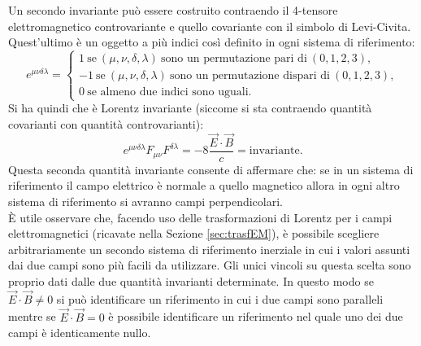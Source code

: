 Un secondo invariante può essere costruito contraendo il 4-tensore elettromagnetico controvariante e quello covariante con il simbolo di Levi-Civita. Quest'ultimo è un oggetto a più indici così definito in ogni sistema di riferimento:
\begin{equation}
    e^{\mu\nu\delta\lambda}=\begin{cases}
        1\ \text{se}\ (\mu,\nu,\delta,\lambda)\ \text{sono un permutazione pari di}\ (0,1,2,3),\\
        -1\ \text{se}\ (\mu,\nu,\delta,\lambda)\ \text{sono un permutazione dispari di}\ (0,1,2,3),\\
        0\ \text{se almeno due indici sono uguali.}
    \end{cases}\label{LeviCivita}
\end{equation}
Si ha quindi che è Lorentz invariante (siccome si sta contraendo quantità covarianti con quantità controvarianti):
\begin{equation}
    e^{\mu\nu\delta\lambda}F_{\mu\nu}F^{\delta\lambda}=-8\frac{\vec E\cdot\vec B}{c}=\text{invariante}.
\end{equation}
Questa seconda quantità invariante consente di affermare che: se in un sistema di riferimento il campo elettrico è normale a quello magnetico allora in ogni altro sistema di riferimento si avranno campi perpendicolari.\\ È utile osservare che, facendo uso delle trasformazioni di Lorentz per i campi elettromagnetici (ricavate nella Sezione \ref{sec:trasfEM}), è possibile scegliere arbitrariamente un secondo sistema di riferimento inerziale in cui i valori assunti dai due campi sono più facili da utilizzare. Gli unici vincoli su questa scelta sono proprio dati dalle due quantità invarianti determinate. In questo modo se $\vec E \cdot \vec B\neq0$ si può identificare un riferimento in cui i due campi sono paralleli mentre se $\vec E \cdot \vec B=0$ è possibile identificare un riferimento nel quale uno dei due campi è identicamente nullo.\\

